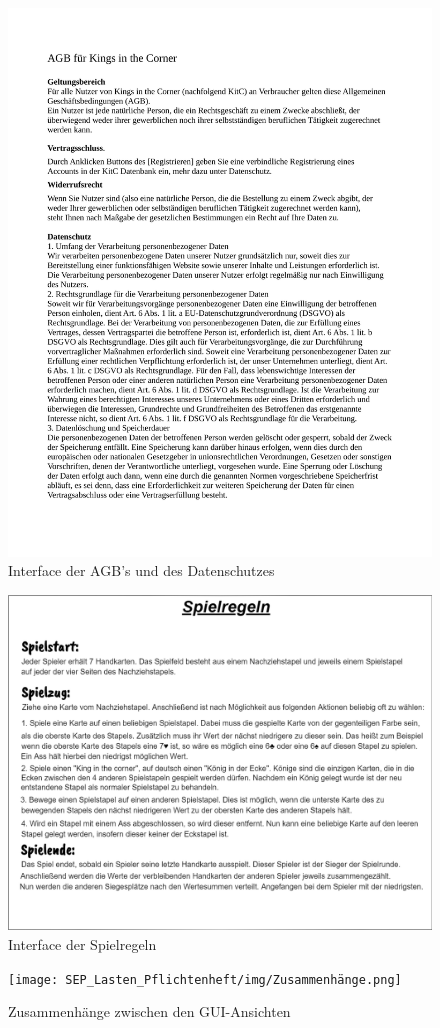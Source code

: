 \begin{figure}
	\centering
	\includegraphics[width=1.1\textwidth]{SEP_Lasten_Pflichtenheft/img/AGB_und_Datenschutz.png}
	\caption{Interface der AGB's und des Datenschutzes}
	\label{gui:agb}
\end{figure}

\begin{figure}
	\centering
	\includegraphics[width=1.1\textwidth]{SEP_Lasten_Pflichtenheft/img/Spielregeln.png}
	\caption{Interface der Spielregeln}
	\label{gui:spielregeln}
\end{figure}

\begin{figure}
	\centering
	\texttt{[image: SEP\_Lasten\_Pflichtenheft/img/Zusammenhänge.png]}
	\caption{Zusammenhänge zwischen den GUI-Ansichten}
	\label{gui:zusammenhang}
\end{figure}